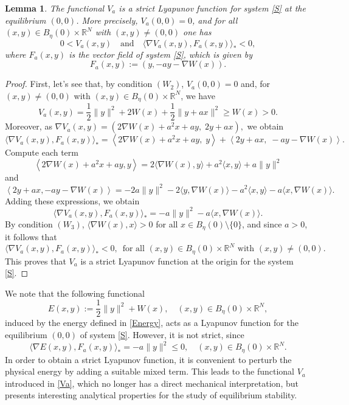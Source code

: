 \documentclass[12pt]{amsart}
\numberwithin{equation}{section}
\newtheorem{lemma}[theorem]{Lemma}
\begin{document}
\begin{lemma}\label{L2}
	The functional $V_a$ is a strict Lyapunov function for system \eqref{S} at the equilibrium $(0,0)$. More precisely, $V_a(0,0)=0$, and for all $(x,y)\in B_\eta(0)\times \mathbb{R}^N$ with $(x,y)\neq(0,0)$ one has
	$$
	0 < V_a(x,y)\quad\text{and}\quad\langle \nabla V_a(x,y), F_a(x,y) \rangle_* < 0,
	$$
	where $F_a(x,y)$ is the vector field of system \eqref{S}, which is given by
	\begin{equation}\label{VectorField}
		F_a(x,y) := (y, -ay - \nabla W(x)).
	\end{equation}
\end{lemma}
\begin{proof}
First, let's see that, by condition \hyperlink{W2}{$(W_2)$}, $V_a(0,0) = 0$ and, for $(x,y) \neq (0,0)$ with $(x,y)\in B_\eta(0)\times \mathbb{R}^N$, we have
$$
V_a(x,y) = \frac{1}{2} \|y\|^2 + 2W(x) + \frac{1}{2} \|y + a x\|^2 \geq W(x) > 0.
$$
Moreover, as $\nabla V_a(x,y) = \left( 2\nabla W(x) + a^2 x + a y,\; 2y + a x \right),$ we obtain
$$
\langle \nabla V_a(x,y), F_a(x,y) \rangle_* = \left\langle 2\nabla W(x) + a^2 x + a y,\; y \right\rangle + \left\langle 2y + a x,\; -a y - \nabla W(x) \right\rangle.
$$
Compute each term
$$
\left\langle 2\nabla W(x) + a^2 x + a y, y \right\rangle= 2\langle \nabla W(x), y \rangle + a^2 \langle x, y \rangle + a \|y\|^2
$$
and 
$$
\left\langle 2y + a x,-a y - \nabla W(x) \right\rangle= -2a \|y\|^2 - 2\langle y, \nabla W(x) \rangle - a^2 \langle x, y \rangle - a \langle x, \nabla W(x) \rangle.
$$
Adding these expressions, we obtain
$$
\langle \nabla V_a(x,y), F_a(x,y) \rangle_* = -a \|y\|^2 - a \langle x, \nabla W(x) \rangle.
$$
By condition \hyperlink{W3}{$(W_3)$}, $\langle \nabla W(x), x \rangle > 0$ for all $x\in  B_\eta(0)\setminus\{0\}$, and since $a > 0$, it follows that
$$
\langle \nabla V_a(x,y), F_a(x,y) \rangle_* < 0,\,  \text{ for all }(x,y)\in B_\eta(0)\times \mathbb{R}^N \text{ with }(x,y) \neq (0,0).
$$
This proves that $V_a$ is a strict Lyapunov function at the origin for the system \eqref{S}.
\end{proof}

We note that the following functional 
$$
E(x,y):=\frac12\|y\|^2 + W(x),\quad (x,y)\in B_\eta(0)\times\mathbb{R}^N,
$$
induced by the energy defined in \eqref{Energy}, acts as a Lyapunov function for the equilibrium $(0,0)$ of system \eqref{S}. However, it is not strict, since
$$
\langle \nabla E(x,y), F_a(x,y) \rangle_* =-a \|y\|^2 \le 0,\quad (x,y)\in B_\eta(0)\times \mathbb{R}^N.
$$
In order to obtain a strict Lyapunov function, it is convenient to perturb the physical energy by adding a suitable mixed term. This leads to the functional $V_a$ introduced in \eqref{Va}, which no longer has a direct mechanical interpretation, but presents interesting analytical properties for the study of equilibrium stability.
\end{document}
